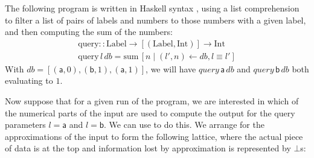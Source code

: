 \begin{example}
  \label{ex:introduction-example}
  The following program is written in Haskell syntax \cite{haskell}, using a list comprehension to filter a list of pairs of labels and numbers to those numbers with a given label, and then computing the sum of the numbers:
  \begin{displaymath}
    \begin{array}{l}
      \mathrm{query} :: \mathrm{Label} \to [(\mathrm{Label}, \mathrm{Int})] \to \mathrm{Int} \\
      \mathrm{query}\,l\,\mathit{db} = \mathrm{sum}\,[ n \mid (l',n) \leftarrow \mathit{db}, l \equiv l' ]
    \end{array}
  \end{displaymath}
  With $\mathit{db} = [(\mathsf{a}, 0), (\mathsf{b}, 1), (\mathsf{a}, 1)]$, we will have $\mathit{query}\,\mathsf{a}\,\mathit{db}$ and $\mathit{query}\,\mathsf{b}\,\mathit{db}$ both evaluating to $1$.

  Now suppose that for a given run of the program, we are interested in which of the numerical parts of the input are used to compute the output for the query parameters $l = \mathsf{a}$ and $l = \mathsf{b}$. We can use \GPS to do this. We arrange for the approximations of the input to form the following lattice, where the actual piece of data is at the top and information lost by approximation is represented by $\bot$s:
  \begin{center}
\end{center}
\end{example}
